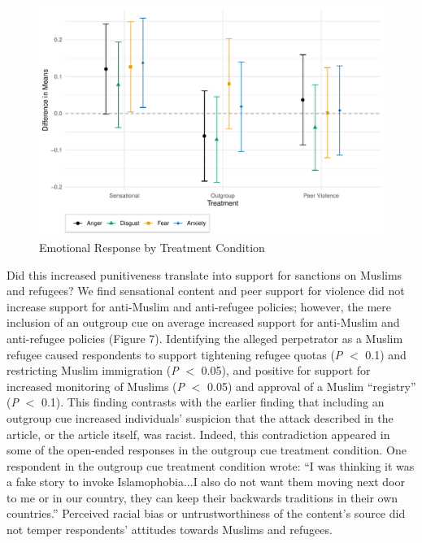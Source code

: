 \begin{figure}[!htbp]
  \centering
  \caption{Emotional Response by Treatment Condition}
  \includegraphics[width=.835\textwidth]{figures/ATE_emotion.pdf}
\end{figure}

Did this increased punitiveness translate into support for sanctions on Muslims and refugees? We find sensational content and peer support for violence did not increase support for anti-Muslim and anti-refugee policies; however, the mere inclusion of an outgroup cue on average increased support for anti-Muslim and anti-refugee policies (Figure 7). Identifying the alleged perpetrator as a Muslim refugee caused respondents to support tightening refugee quotas (\textit{P} $<$ 0.1) and restricting Muslim immigration  (\textit{P} $<$ 0.05), and positive for support for increased monitoring of Muslims  (\textit{P} $<$ 0.05) and approval of a Muslim ``registry'' (\textit{P} $<$ 0.1). This finding contrasts with the earlier finding that including an outgroup cue increased individuals' suspicion that the attack described in the article, or the article itself, was racist. Indeed, this contradiction appeared in some of the open-ended responses in the outgroup cue treatment condition. One respondent in the outgroup cue treatment condition wrote: ``I was thinking it was a fake story to invoke Islamophobia...I also do not want them moving next door to me or in our country, they can keep their backwards traditions in their own countries.'' Perceived racial bias or untrustworthiness of the content's source did not temper respondents' attitudes towards Muslims and refugees.

